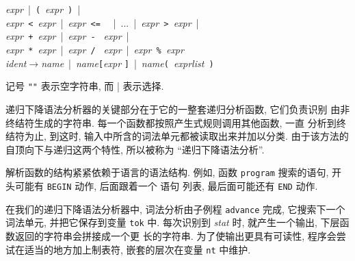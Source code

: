 \begin{tabbing}
    \textit{expr}\ |\ \texttt{(}\ \textit{expr}\ \texttt{)}\ | \\
    \>\>\textit{expr}\texttt{ < }\textit{expr}\ |\ \textit{expr}\texttt{ <= }
    \ |\ ...\ |\ \textit{expr}\texttt{ > }\textit{expr}\ |\\
    \>\>\textit{expr}\texttt{ + }\textit{expr}\ |\ \textit{expr}\texttt{ - }
    \textit{expr}\ |\\
    \>\>\textit{expr}\texttt{ * }\textit{expr}\ |\ \textit{expr}\texttt{ / }
    \textit{expr}\ |\ \textit{expr}\verb' % '\textit{expr}\\
    \hspace{4em}
    \textit{ident}\>$\to$\>\textit{name}\ |\ \textit{name}\texttt{[}\textit{expr}%
    \texttt{]}\ |\ \textit{name}\texttt{( }\textit{exprlist}\texttt{ )}
\end{tabbing}
记号 \texttt{""} 表示空字符串, 而 | 表示选择.

递归下降语法分析器的关键部分在于它的一整套递归分析函数, 它们负责识别
由非终结符生成的字符串. 每一个函数都按照产生式规则调用其他函数, 一直
分析到终结符为止, 到这时, 输入中所含的词法单元都被读取出来并加以分类.
由于该方法的自顶向下与递归这两个特性, 所以被称为 ``递归下降语法分析''.

解析函数的结构紧紧依赖于语言的语法结构. 例如, 函数 \texttt{program}
搜索的语句, 开头可能有 \texttt{BEGIN} 动作, 后面跟着一个 \patact 语句
列表, 最后面可能还有 \texttt{END} 动作.

在我们的递归下降语法分析器中, 词法分析由子例程 \texttt{advance} 完成,
它搜索下一个词法单元, 并把它保存到变量 \texttt{tok} 中. 每次识别到
\textit{stat} 时, 就产生一个输出, 下层函数返回的字符串会拼接成一个更
长的字符串. 为了使输出更具有可读性, 程序会尝试在适当的地方加上制表符,
嵌套的层次在变量 \texttt{nt} 中维护.

